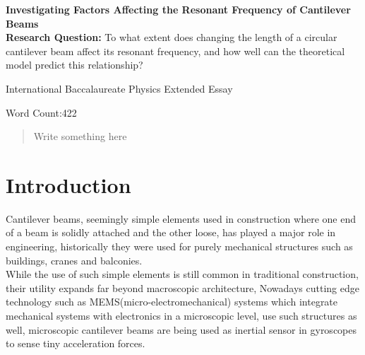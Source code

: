 \documentclass[a4paper,12pt]{article}
\newcommand{\ResearchQ}{To what extent does changing the length of a circular cantilever beam affect its resonant frequency, and how well can the theoretical model predict this relationship?}
\begin{document}
\begin{titlepage}
    \begin{center}
        \vspace*{1cm}

        \textbf{Investigating Factors Affecting the Resonant Frequency of Cantilever Beams}\\

        \vspace{.5cm}
        \textbf{Research Question:}
        \ResearchQ

        \vspace{0.5cm}
        International Baccalaureate Physics Extended Essay

        \vfill

        \vspace{0.8cm}

        Word Count:422


    \end{center}
\end{titlepage}


\tableofcontents
{}
\pagebreak

\begin{abstract}

    Write something here

\end{abstract}
\pagebreak


\section{Introduction}%

Cantilever beams, seemingly simple elements used in construction where one end of a beam is solidly attached and the other loose, has played a major role in engineering, historically they were used for purely mechanical structures such as buildings, cranes and balconies.
\autocite{BuildingConstructionBook}\\
While the use of such simple elements is still common in traditional construction, their utility expands far beyond macroscopic architecture, Nowadays cutting edge technology such as MEMS(micro-electromechanical) systems which integrate mechanical systems with electronics in a microscopic level, use such structures as well, microscopic cantilever beams are being used as inertial sensor in gyroscopes to sense tiny acceleration forces.
\autocite{MemsBook}%
\end{document}
